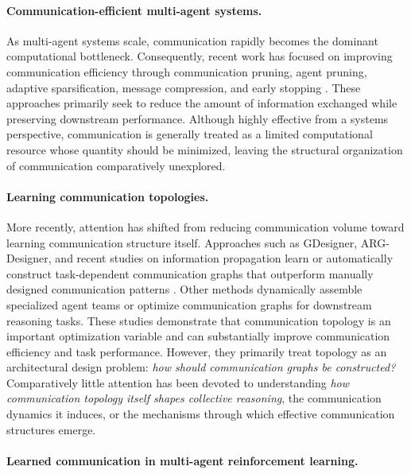 \documentclass[11pt]{article}
\begin{document}
\paragraph{Communication-efficient multi-agent systems.}

As multi-agent systems scale, communication rapidly becomes the dominant computational bottleneck. Consequently, recent work has focused on improving communication efficiency through communication pruning, agent pruning, adaptive sparsification, message compression, and early stopping \citep{zhang2025cut,wang-etal-2025-agentdropout}. These approaches primarily seek to reduce the amount of information exchanged while preserving downstream performance. Although highly effective from a systems perspective, communication is generally treated as a limited computational resource whose quantity should be minimized, leaving the structural organization of communication comparatively unexplored.

\paragraph{Learning communication topologies.}

More recently, attention has shifted from reducing communication volume toward learning communication structure itself. Approaches such as GDesigner, ARG-Designer, and recent studies on information propagation learn or automatically construct task-dependent communication graphs that outperform manually designed communication patterns \citep{zhang2025gdesigner,li2026assemble,shen-etal-2025-understanding}. Other methods dynamically assemble specialized agent teams or optimize communication graphs for downstream reasoning tasks. These studies demonstrate that communication topology is an important optimization variable and can substantially improve communication efficiency and task performance. However, they primarily treat topology as an architectural design problem: \emph{how should communication graphs be constructed?} Comparatively little attention has been devoted to understanding \emph{how communication topology itself shapes collective reasoning}, the communication dynamics it induces, or the mechanisms through which effective communication structures emerge.

\paragraph{Learned communication in multi-agent reinforcement learning.}
\end{document}
